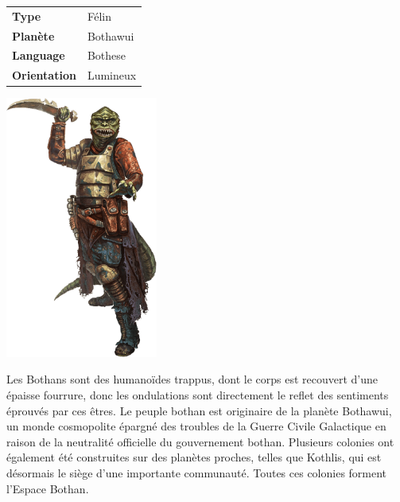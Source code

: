 \begin{flushright}
\begin{tabular}{ l l }
	\textbf{Type} 			& Félin \\
   	\textbf{Planète} 		& Bothawui \\
   	\textbf{Language} 		& Bothese \\
   	\textbf{Orientation} 	& Lumineux \\
\end{tabular}
\end{flushright}

\vspace{-50}
\includegraphics[width=5cm]{img/races/barabel.png}

Les Bothans sont des humanoïdes trappus, dont le corps est recouvert d'une épaisse fourrure, donc les ondulations sont directement le reflet des sentiments éprouvés par ces êtres. 
Le peuple bothan est originaire de la planète Bothawui, un monde cosmopolite épargné des troubles de la Guerre Civile Galactique en raison de la neutralité officielle du gouvernement bothan. Plusieurs colonies ont également été construites sur des planètes proches, telles que Kothlis, qui est désormais le siège d'une importante communauté. Toutes ces colonies forment l'Espace Bothan. 

